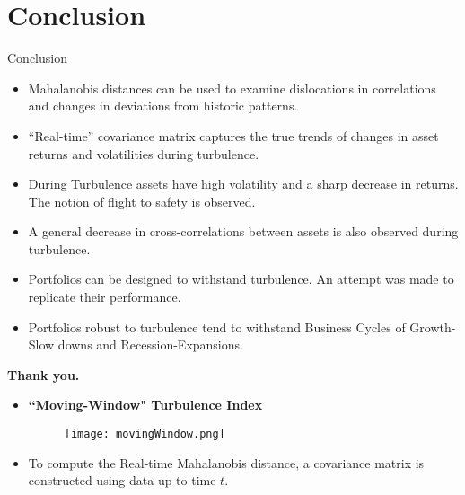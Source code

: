 \documentclass{beamer}
\newcommand*{\LargerCdot}{\raisebox{-0.25ex}{\scalebox{2.3}{$\cdot$}}}
\begin{document}
\section{Conclusion}
\begin{frame}{Conclusion}{}
		\vspace*{-0 in}
		\begin{itemize}
			\item{Mahalanobis distances can be used to examine dislocations in correlations and changes in deviations from historic patterns.}
			\item{``Real-time'' covariance matrix captures the true trends of changes in asset returns and volatilities during turbulence.}
			\item{During Turbulence assets have high volatility and a sharp decrease in returns. The notion of flight to safety is observed.}
			\item{A general decrease in cross-correlations between assets is also observed during turbulence.}
			\item{Portfolios can be designed to withstand turbulence. An attempt was made to replicate their performance.}
			\item{Portfolios robust to turbulence tend to withstand Business Cycles of Growth-Slow downs and Recession-Expansions.} 
	\end{itemize}
\end{frame}


\begin{frame}{}{}
	\vspace*{0.6in}
	\hspace*{1.6in}\textbf{\Large{\Large{Thank you.}}}
\end{frame}

\begin{frame}{}{}
	\vspace*{-0.06 in}
  	\begin{itemize}
		\item{\textbf{``Moving-Window" Turbulence Index}}
		\vspace*{-0.58cm}
		\begin{figure}
			\scalebox{0.5}
			{\hspace*{-0.3in}\texttt{[image: movingWindow.png]} }
		\end{figure}
		\vspace*{-0.5cm}
		\item{To compute the Real-time Mahalanobis distance, a covariance matrix is constructed using data up to time $t$.}
	\end{itemize}
\end{frame}
\end{document}
